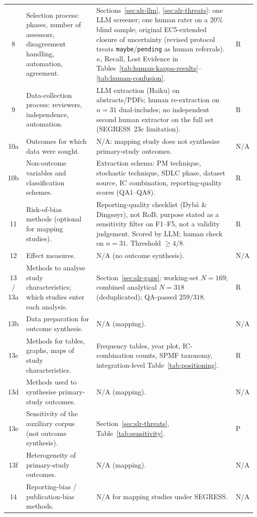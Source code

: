 \begin{longtable}{c p{4.4cm} p{6.6cm} l}
8 & Selection process: phases, number of assessors, disagreement handling, automation, agreement. & Sections~\ref{sec:slr-llm}, \ref{sec:slr-threats}: one LLM screener; one human rater on a 20\% blind sample; original EC5-extended closure of uncertainty (revised protocol treats \texttt{maybe}/\texttt{pending} as human referrals). $\kappa$, Recall, Lost Evidence in Tables~\ref{tab:human-kappa-results}--\ref{tab:human-confusion}. & R \\
9 & Data-collection process: reviewers, independence, automation. & LLM extraction (Haiku) on abstracts/PDFs; human re-extraction on $n=31$ dual-includes; no independent second human extractor on the full set (SEGRESS~23c limitation). & R \\
10a & Outcomes for which data were sought. & N/A: mapping study does not synthesise primary-study outcomes. & N/A \\
10b & Non-outcome variables and classification schemes. & Extraction schema: PM technique, stochastic technique, SDLC phase, dataset source, IC combination, reporting-quality scores (QA1--QA8). & R \\
11 & Risk-of-bias methods (optional for mapping studies). & Reporting-quality checklist (Dyb{\aa} \& Dings{\o}yr), not RoB; purpose stated as a sensitivity filter on F1--F5, not a validity judgement. Scored by LLM; human check on $n=31$. Threshold $\geq 4/8$. & R \\
12 & Effect measures. & N/A (no outcome synthesis). & N/A \\
13 / 13a & Methods to analyse study characteristics; which studies enter each analysis. & Section~\ref{sec:slr-gaps}: working-set $N=169$; combined analytical $N=318$ (deduplicated); QA-passed $259/318$. & R \\
13b & Data preparation for outcome synthesis. & N/A (mapping). & N/A \\
13c & Methods for tables, graphs, maps of study characteristics. & Frequency tables, year plot, IC-combination counts, SPMF taxonomy, integration-level Table~\ref{tab:positioning}. & R \\
13d & Methods used to synthesise primary-study outcomes. & N/A (mapping). & N/A \\
13e & Sensitivity of the auxiliary corpus (not outcome synthesis). & Section~\ref{sec:slr-threats}, Table~\ref{tab:sensitivity}. & P \\
13f & Heterogeneity of primary-study outcomes. & N/A (mapping). & N/A \\
14 & Reporting-bias / publication-bias methods. & N/A for mapping studies under SEGRESS. & N/A \\

\end{longtable}
